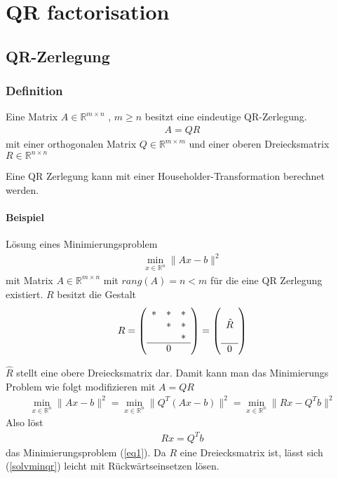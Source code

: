\chapter{QR factorisation}

\section{QR-Zerlegung}
\subsection{Definition}
Eine Matrix $A \in \mathbb{R}^{m \times n}$ , $m \ge n$ besitzt eine eindeutige QR-Zerlegung.
\begin{align}
	A = QR
\end{align}
mit einer orthogonalen Matrix $ Q \in \mathbb{R}^{m \times m} $ und einer oberen Dreiecksmatrix $ R \in \mathbb{R}^{n \times n}$ \cite{num1}

Eine QR Zerlegung kann mit einer Householder-Transformation berechnet werden.

\subsubsection{Beispiel}
Lösung eines Minimierungsproblem
\begin{align}
	\min_{x \in \mathbb{R}^n} \|Ax-b\|^2 \label{eq1}
\end{align}
mit Matrix $A \in \mathbb{R}^{m\times n}$ mit $rang(A) = n < m$ für die eine QR Zerlegung existiert.
$R$ besitzt die Gestalt 
\begin{align*}
	R=	
	\left(\begin{array}{ccc}
		*&*&* \\ 
		&*&* \\ 
		& &* \\ \hline
		& 0 &
	\end{array} \right)
	=
	\left(\begin{array}{c}
	 \\ 
	\hat{R} \\ 
	 \\ \hline
	0
	\end{array} \right) 
\end{align*}

$\hat{R}$ stellt eine obere Dreiecksmatrix dar.
Damit kann man das Minimierungs Problem wie folgt modifizieren mit $A=QR$
\begin{align}
		\min_{x \in \mathbb{R}^n} \|Ax-b\|^2 =
		\min_{x \in \mathbb{R}^n} \|Q^T(Ax-b)\|^2 =
		\min_{x \in \mathbb{R}^n} \|Rx-Q^Tb\|^2
\end{align}
Also löst
\begin{align}
Rx=Q^Tb \label{solvminqr}
\end{align}
das Minimierungsproblem (\ref{eq1}). Da $R$ eine Dreiecksmatrix ist, lässt sich (\ref{solvminqr}) leicht mit Rückwärtseinsetzen  lösen.

